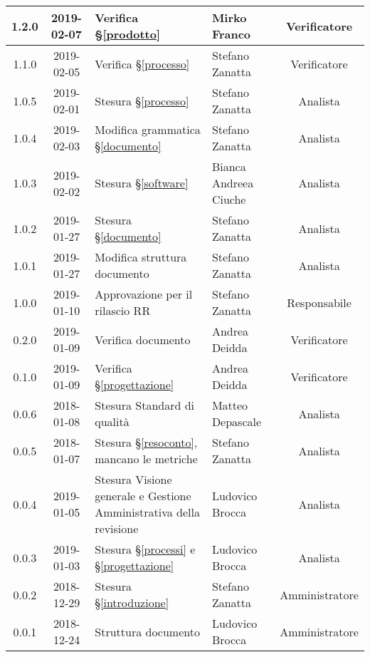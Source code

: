 \begin{center}
\begin{tabularx}{\textwidth}{|c|c|X|X|c|}
			\hline
			1.2.0 & 2019-02-07 & Verifica \S\ref{prodotto} & Mirko Franco & Verificatore \\
			\hline
			1.1.0 & 2019-02-05 & Verifica \S\ref{processo}& Stefano Zanatta & Verificatore\\
			\hline
			1.0.5 & 2019-02-01 & Stesura \S\ref{processo}& Stefano Zanatta & Analista\\
			\hline
			1.0.4 & 2019-02-03 & Modifica grammatica \S\ref{documento}& Stefano Zanatta & Analista\\
			\hline
			1.0.3 & 2019-02-02 & Stesura \S\ref{software}& Bianca Andreea Ciuche & Analista\\
			\hline
			1.0.2 & 2019-01-27 & Stesura \S\ref{documento}& Stefano Zanatta & Analista\\
			\hline
			1.0.1 & 2019-01-27 & Modifica struttura documento & Stefano Zanatta & Analista\\
			\hline
			1.0.0 & 2019-01-10 & Approvazione per il rilascio RR & Stefano Zanatta & Responsabile\\
			\hline
			0.2.0 & 2019-01-09 & Verifica documento & Andrea Deidda & Verificatore\\
			\hline
			0.1.0 & 2019-01-09 & Verifica \S\ref{progettazione} & Andrea Deidda & Verificatore\\
			\hline
			0.0.6 & 2018-01-08 & Stesura Standard di qualità & Matteo Depascale & Analista\\
			\hline
			0.0.5 & 2018-01-07 & Stesura \S\ref{resoconto}, mancano le metriche & Stefano Zanatta & Analista\\
			\hline
			0.0.4 & 2019-01-05 & Stesura Visione generale e Gestione Amministrativa della revisione  & Ludovico Brocca& Analista\\
			\hline
			0.0.3 & 2019-01-03& Stesura \S\ref{processi} e \S\ref{progettazione} &Ludovico Brocca & Analista\\
			\hline
			0.0.2 & 2018-12-29 & Stesura \S\ref{introduzione} & Stefano Zanatta & Amministratore\\
			\hline
			0.0.1 & 2018-12-24 & Struttura documento & Ludovico Brocca & Amministratore\\
			\hline
		\end{tabularx}
	\end{center}
\newpage
